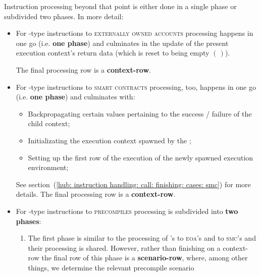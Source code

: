 Instruction processing beyond that point is either done in a single phase or subdivided two phases.
In more detail:
\begin{itemize}
	\item
		For -type instructions
		to \textsc{externally owned accounts}
		processing happens in one go (i.e. \textbf{one phase}) and culminates in the update of the present execution context's return data (which is reset to being empty $(\,)$).

		The final processing row is a \textbf{context-row}.
	\item
		For -type instructions
		to \textsc{smart contracts}
		processing, too, happens in one go (i.e. \textbf{one phase}) and culminates with:
		\begin{itemize}
			\item Backpropagating certain values pertaining to the success / failure of the child context;
			\item Initializating the execution context spawned by the ;
			\item Setting up the first row of the execution of the newly spawned execution environment;
		\end{itemize}
		See section~(\ref{hub: instruction handling: call: finishing: cases: smc}) for more details.
		The final processing row is a \textbf{context-row}.
	\item
		For -type instructions
		to \textsc{precompiles}
		processing is subdivided into \textbf{two phases}:
		\begin{enumerate}
			\item
				The first phase is similar to the processing of 's to \textsc{eoa}'s and to \textsc{smc}'s and their processing is shared.
				However, rather than finishing on a context-row the final row of this phase is a \textbf{scenario-row}, where, among other things, we determine the relevant precompile scenario


\end{enumerate}
\end{itemize}
